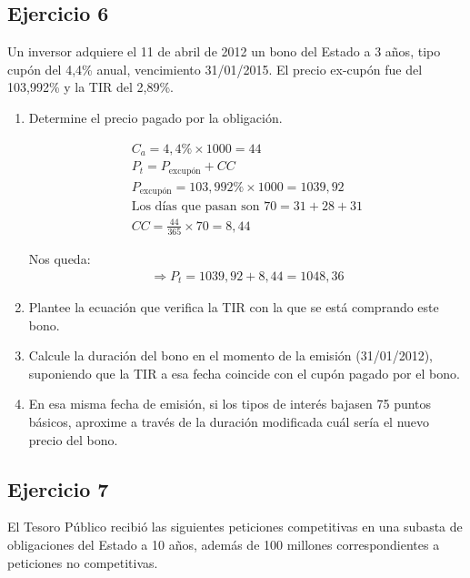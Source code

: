 \subsection*{Ejercicio 6}

Un inversor adquiere el 11 de abril de 2012 un bono del Estado a 3 años, tipo cupón del 4,4\% anual, vencimiento 31/01/2015. El precio ex-cupón fue del 103,992\% y la TIR del 2,89\%.

\begin{enumerate}[label=\textbf{\alph*)}]
    \item Determine el precio pagado por la obligación.
    
    \begin{align*}
        C_a = 4,4\% \times 1000 = 44 \\
        P_t = P_{\text{excupón}} + CC \\
        P_{\text{excupón}} = 103,992\% \times 1000 = 1039,92 \\
        \text{Los días que pasan son } 70 = 31 + 28 + 31 \\
        CC = \frac{44}{365} \times 70 = 8,44
    \end{align*}

    Nos queda:
    \begin{align*}
        \Rightarrow P_t = 1039,92 + 8,44 = 1048,36
    \end{align*}

    \item Plantee la ecuación que verifica la TIR con la que se está comprando este bono.
    


    \item Calcule la duración del bono en el momento de la emisión (31/01/2012), suponiendo que la TIR a esa fecha coincide con el cupón pagado por el bono.
    \item En esa misma fecha de emisión, si los tipos de interés bajasen 75 puntos básicos, aproxime a través de la duración modificada cuál sería el nuevo precio del bono.
\end{enumerate}



\subsection*{Ejercicio 7 }

El Tesoro Público recibió las siguientes peticiones competitivas en una subasta de obligaciones del Estado a 10 años, además de 100 millones correspondientes a peticiones no competitivas.

